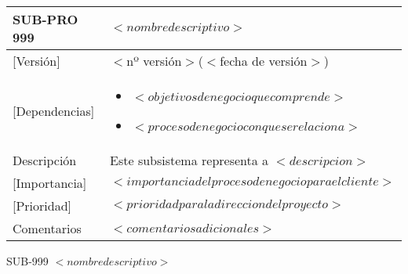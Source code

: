  \begin{Artefacto}[H]
    \centering
    \begin{tabular}{|p{3cm}|p{10cm}|}
        \hline
         \cellcolor{gray30}  SUB-PRO 999	&  $<nombre descriptivo>$\\ 
        \hline
         \cellcolor{gray30}  [Versión]	&  $<$nº versión$>$($<$fecha de versión$>$)\\   
         \hline
         \cellcolor{gray30}  [Dependencias] &  	\begin{itemize} \item $<objetivos de negocio que comprende>$
\item	$<proceso de negocio con que se relaciona>$ \end{itemize}\\  
        \hline
        \cellcolor{gray30} Descripción	& Este subsistema representa a $<descripcion >$  \\
        \hline
         \cellcolor{gray30}[Importancia]	& $<importancia del proceso de negocio para el cliente>$  \\
        \hline
         \cellcolor{gray30}  [Prioridad] &  	$<prioridad para la direccion del proyecto>$\\
         \hline
         \cellcolor{gray30}  Comentarios	&$<comentarios adicionales >$\\   
        \hline
  
    \end{tabular}
\caption{SUB-999	$<nombre descriptivo>$ }
  \end{Artefacto}



